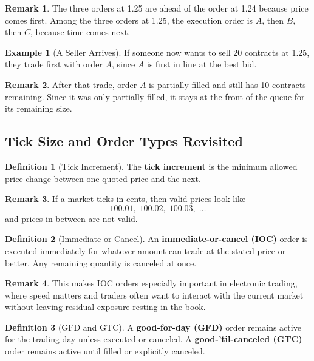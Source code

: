 \documentclass[11pt]{article}
\theoremstyle{definition}
\newtheorem{definition}{Definition}[section]
\newtheorem{example}{Example}[section]
\newtheorem{remark}{Remark}[section]
\begin{document}
\begin{remark}
The three orders at 1.25 are ahead of the order at 1.24 because price comes first. Among the three orders at 1.25, the execution order is \(A\), then \(B\), then \(C\), because time comes next.
\end{remark}

\begin{example}[A Seller Arrives]
If someone now wants to sell 20 contracts at 1.25, they trade first with order \(A\), since \(A\) is first in line at the best bid.
\end{example}

\begin{remark}
After that trade, order \(A\) is partially filled and still has 10 contracts remaining. Since it was only partially filled, it stays at the front of the queue for its remaining size.
\end{remark}

\subsection{Tick Size and Order Types Revisited}

\begin{definition}[Tick Increment]
The \textbf{tick increment} is the minimum allowed price change between one quoted price and the next.
\end{definition}

\begin{remark}
If a market ticks in cents, then valid prices look like
\[
100.01,\; 100.02,\; 100.03,\; \dots
\]
and prices in between are not valid.
\end{remark}

\begin{definition}[Immediate-or-Cancel]
An \textbf{immediate-or-cancel (IOC)} order is executed immediately for whatever amount can trade at the stated price or better. Any remaining quantity is canceled at once.
\end{definition}

\begin{remark}
This makes IOC orders especially important in electronic trading, where speed matters and traders often want to interact with the current market without leaving residual exposure resting in the book.
\end{remark}

\begin{definition}[GFD and GTC]
A \textbf{good-for-day (GFD)} order remains active for the trading day unless executed or canceled. A \textbf{good-'til-canceled (GTC)} order remains active until filled or explicitly canceled.
\end{definition}
\end{document}
